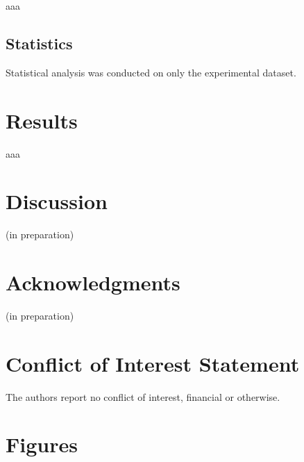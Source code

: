 \documentclass[preprint,11pt]{elsarticle}
\begin{document}
aaa

\subsection{Statistics}

Statistical analysis was conducted on only the experimental dataset.








\section{Results}
\label{sec:results}

aaa


\section{Discussion}
\label{sec:discussion}

(in preparation)




\section*{Acknowledgments}

(in preparation)


\section*{Conflict of Interest Statement}
The authors report no conflict of interest, financial or otherwise.





\clearpage
\section*{Figures}








\end{document}
